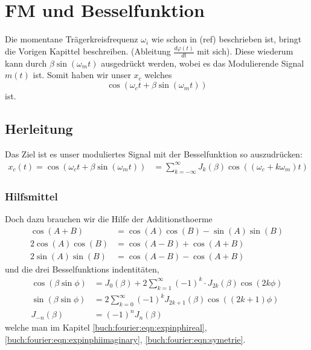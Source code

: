 %
%
%
\section{FM und Besselfunktion 
\label{fm:section:proof}}
Die momentane Trägerkreisfrequenz \(\omega_i\) wie schon in (ref) beschrieben ist, bringt die Vorigen Kapittel beschreiben. (Ableitung \(\frac{d \varphi(t)}{dt}\) mit sich).
Diese wiederum kann durch \(\beta\sin(\omega_mt)\) ausgedrückt werden, wobei es das Modulierende Signal \(m(t)\) ist.
Somit haben wir unser \(x_c\) welches 
\[
\cos(\omega_c t+\beta\sin(\omega_mt))
\]
ist.

\subsection{Herleitung}
Das Ziel ist es unser moduliertes Signal mit der Besselfunktion so auszudrücken:
\begin{align}
    x_c(t)
    = 
    \cos(\omega_ct+\beta\sin(\omega_mt))
    &=
    \sum_{k= -\infty}^\infty J_{k}(\beta) \cos((\omega_c+k\omega_m)t)
    \label{fm:eq:proof}
\end{align}

\subsubsection{Hilfsmittel}
Doch dazu brauchen wir die Hilfe der Additionsthoerme 
\begin{align}
    \cos(A + B) 
    &= 
    \cos(A)\cos(B)-\sin(A)\sin(B)
    \label{fm:eq:addth1}
    \\
    2\cos (A)\cos (B)
    &=
    \cos(A-B)+\cos(A+B)
    \label{fm:eq:addth2}
    \\
    2\sin(A)\sin(B)
    &=
    \cos(A-B)-\cos(A+B)
    \label{fm:eq:addth3}
\end{align}
und die drei Besselfunktions indentitäten,
\begin{align}
    \cos(\beta\sin\phi)
    &=
    J_0(\beta) + 2\sum_{k=1}^\infty(-1)^k \cdot J_{2k}(\beta) \cos(2k\phi)
    \label{fm:eq:besselid1}
    \\
    \sin(\beta\sin\phi)
    &=
    2\sum_{k=0}^\infty (-1)^k J_{2k+1}(\beta) \cos((2k+1)\phi)
    \label{fm:eq:besselid2}
    \\
    J_{-n}(\beta) &= (-1)^n J_n(\beta)
    \label{fm:eq:besselid3}
\end{align}
welche man im Kapitel \eqref{buch:fourier:eqn:expinphireal}, \eqref{buch:fourier:eqn:expinphiimaginary}, \eqref{buch:fourier:eqn:symetrie}.

